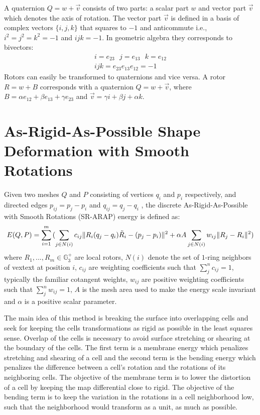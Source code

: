 \documentclass{birkjour}
\numberwithin{equation}{section}
\begin{document}
A quaternion $Q = w + \vec v$ consists of two parts: a scalar part $w$ and vector part $\vec v$ which denotes the axis of rotation. The vector part $\vec v$ is defined in a basis of complex vectors $\{ i, j, k \}$ that squares to $-1$ and anticommute i.e., $i^2 = j^2 = k^2 = -1$ and $i j k = -1$. In geometric algebra they corresponds to bivectors:
\begin{eqnarray}
i = e_{23} \ \ \ j = e_{13} \ \ \  k = e_{12} \\
ijk = e_{23} e_{13} e_{12} = -1 \nonumber
\end{eqnarray}
Rotors can easily be transformed to quaternions and vice versa. A rotor $R = w + B$ corresponds with a quaternion $Q = w + \vec v$, where $B = \alpha e_{12} + \beta e_{13} + \gamma e_{23}$ and $\vec v = \gamma i + \beta j + \alpha k$.

\section{As-Rigid-As-Possible Shape Deformation with Smooth Rotations}

Given two meshes $Q$ and $P$ consisting of vertices $q_i$ and $p_i$ respectively, and directed edges $p_{ij} = p_j - p_i$ and $q_{ij} = q_j - q_i$ , the discrete As-Rigid-As-Possible with Smooth Rotations (SR-ARAP) energy is defined as:
\begin{equation}
E(Q, P) = \sum_{i=1}^m { (\sum_{j \in N(i)} { c_{ij} \|R_i (q_j - q_i) \tilde R_i - (p_j - p_i)  \|^2 } \nonumber \\
+ \alpha A \sum_{j \in N(i)} {w_{ij} \| R_j - R_i \|^2} )}\nonumber
\end{equation}
where $R_1, ..., R_m \in \mathbb{G}^{+}_3$ are local rotors, $N(i)$ denote the set of $1$-ring neighbors of vextext at position $i$, $c_{ij}$ are weighting coefficients such that $\sum_j^n{c_{ij}} = 1$, typically the familiar cotangent weights, $w_{ij}$ are positive weighting coefficients such that $\sum_j^n{w_{ij}} = 1$, $A$ is the mesh area used to make the energy scale invariant and $\alpha$ is a positive scalar parameter.

The main idea of this method is breaking the surface into overlapping cells and seek for keeping the cells transformations as rigid as possible in the least squares sense. Overlap of the cells is necessary to avoid surface stretching or shearing at the boundary of the cells. 
The first term is a membrane energy which penalizes stretching and shearing of a cell and the second term is the bending energy which penalizes the difference between a cell's rotation and the rotations of its neighboring cells. 
The objective of the membrane term is to lower the distortion of a cell by keeping the map differential close to rigid. 
The objective of the bending term is to keep the variation in the rotations in a cell neighborhood low, such that the neighborhood would transform as a unit, as much as possible. 
\end{document}
